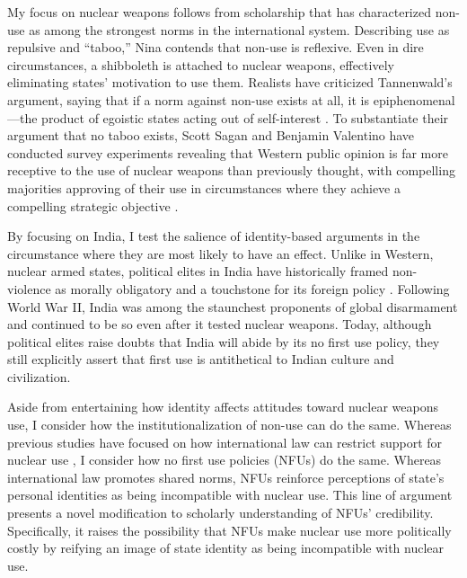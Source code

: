 \documentclass[12pt]{article}
\begin{document}
My focus on nuclear weapons follows from scholarship that has characterized non-use as among the strongest norms in the international system. Describing use as repulsive and “taboo,” Nina \citet{tannenwald_nuclear_2007} contends that non-use is reflexive. Even in dire circumstances, a shibboleth is attached to nuclear weapons, effectively eliminating states' motivation to use them. Realists have criticized Tannenwald's argument, saying that if a norm against non-use exists at all, it is epiphenomenal—the product of egoistic states acting out of self-interest \citep{sagan_realist_2004}. To substantiate their argument that no taboo exists, Scott Sagan and Benjamin Valentino have conducted survey experiments revealing that Western public opinion is far more receptive to the use of nuclear weapons than previously thought, with compelling majorities approving of their use in circumstances where they achieve a compelling strategic objective \citep{press_atomic_2013, sagan_revisiting_2017, dill_kettles_2022}.

By focusing on India, I test the salience of identity-based arguments in the circumstance where they are most likely to have an effect. Unlike in Western, nuclear armed states, political elites in India have historically framed non-violence as morally obligatory and a touchstone for its foreign policy \citep{perkovich_indias_2001, hymans_psychology_2006, mehta_still_2009, bajpai_indian_2014}. Following World War II, India was among the staunchest proponents of global disarmament and continued to be so even after it tested nuclear weapons. Today, although political elites raise doubts that India will abide by its no first use policy, they still explicitly assert that first use is antithetical to Indian culture and civilization.

Aside from entertaining how identity affects attitudes toward nuclear weapons use, I consider how the institutionalization of non-use can do the same. Whereas previous studies have focused on how international law can restrict support for nuclear use \citep{carpenter_stopping_2020, sagan_atomic_2024}, I consider how no first use policies (NFUs)  do the same. Whereas international law promotes shared norms, NFUs reinforce perceptions of state's personal identities as being incompatible with nuclear use. This line of argument presents a novel modification to scholarly understanding of NFUs' credibility. Specifically, it raises the possibility that NFUs make nuclear use more politically costly by reifying an image of state identity as being incompatible with nuclear use.
\end{document}
